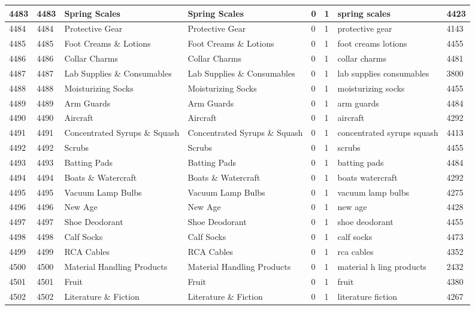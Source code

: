 \begin{longtable}{|l|l|l|l|l|l|l|l|}
4483 & 4483 & Spring Scales & Spring Scales & 0 & 1 & spring scales & 4423 \\ \hline 
4484 & 4484 & Protective Gear & Protective Gear & 0 & 1 & protective gear & 4143 \\ \hline 
4485 & 4485 & Foot Creams \& Lotions & Foot Creams \& Lotions & 0 & 1 & foot creams lotions & 4455 \\ \hline 
4486 & 4486 & Collar Charms & Collar Charms & 0 & 1 & collar charms & 4481 \\ \hline 
4487 & 4487 & Lab Supplies \& Consumables & Lab Supplies \& Consumables & 0 & 1 & lab supplies consumables & 3800 \\ \hline 
4488 & 4488 & Moisturizing Socks & Moisturizing Socks & 0 & 1 & moisturizing socks & 4455 \\ \hline 
4489 & 4489 & Arm Guards & Arm Guards & 0 & 1 & arm guards & 4484 \\ \hline 
4490 & 4490 & Aircraft & Aircraft & 0 & 1 & aircraft & 4292 \\ \hline 
4491 & 4491 & Concentrated Syrups \& Squash & Concentrated Syrups \& Squash & 0 & 1 & concentrated syrups squash & 4413 \\ \hline 
4492 & 4492 & Scrubs & Scrubs & 0 & 1 & scrubs & 4455 \\ \hline 
4493 & 4493 & Batting Pads & Batting Pads & 0 & 1 & batting pads & 4484 \\ \hline 
4494 & 4494 & Boats \& Watercraft & Boats \& Watercraft & 0 & 1 & boats watercraft & 4292 \\ \hline 
4495 & 4495 & Vacuum Lamp Bulbs & Vacuum Lamp Bulbs & 0 & 1 & vacuum lamp bulbs & 4275 \\ \hline 
4496 & 4496 & New Age & New Age & 0 & 1 & new age & 4428 \\ \hline 
4497 & 4497 & Shoe Deodorant & Shoe Deodorant & 0 & 1 & shoe deodorant & 4455 \\ \hline 
4498 & 4498 & Calf Socks & Calf Socks & 0 & 1 & calf socks & 4473 \\ \hline 
4499 & 4499 & RCA Cables & RCA Cables & 0 & 1 & rca cables & 4352 \\ \hline 
4500 & 4500 & Material Handling Products & Material Handling Products & 0 & 1 & material h ling products & 2432 \\ \hline 
4501 & 4501 & Fruit & Fruit & 0 & 1 & fruit & 4380 \\ \hline 
4502 & 4502 & Literature \& Fiction & Literature \& Fiction & 0 & 1 & literature fiction & 4267 \\ \hline 

\end{longtable}

